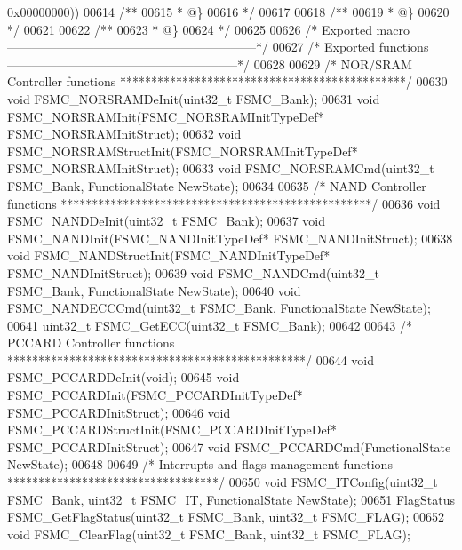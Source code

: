 \begin{DoxyCode}
      0x00000000\textcolor{preprocessor}{)}\textcolor{preprocessor}{)}
00614 \textcolor{comment}{/**}
00615 \textcolor{comment}{  * @\}}
00616 \textcolor{comment}{  */}
00617 
00618 \textcolor{comment}{/**}
00619 \textcolor{comment}{  * @\}}
00620 \textcolor{comment}{  */}
00621 
00622 \textcolor{comment}{/**}
00623 \textcolor{comment}{  * @\}}
00624 \textcolor{comment}{  */}
00625 
00626 \textcolor{comment}{/* Exported macro ------------------------------------------------------------*/}
00627 \textcolor{comment}{/* Exported functions --------------------------------------------------------*/}
00628 
00629 \textcolor{comment}{/* NOR/SRAM Controller functions **********************************************/}
00630 \textcolor{keywordtype}{void} FSMC_NORSRAMDeInit(uint32\_t FSMC\_Bank);
00631 \textcolor{keywordtype}{void} FSMC_NORSRAMInit(FSMC\_NORSRAMInitTypeDef* FSMC\_NORSRAMInitStruct);
00632 \textcolor{keywordtype}{void} FSMC_NORSRAMStructInit(FSMC\_NORSRAMInitTypeDef* FSMC\_NORSRAMInitStruct);
00633 \textcolor{keywordtype}{void} FSMC_NORSRAMCmd(uint32\_t FSMC\_Bank, FunctionalState NewState);
00634 
00635 \textcolor{comment}{/* NAND Controller functions **************************************************/}
00636 \textcolor{keywordtype}{void} FSMC_NANDDeInit(uint32\_t FSMC\_Bank);
00637 \textcolor{keywordtype}{void} FSMC_NANDInit(FSMC\_NANDInitTypeDef* FSMC\_NANDInitStruct);
00638 \textcolor{keywordtype}{void} FSMC_NANDStructInit(FSMC\_NANDInitTypeDef* FSMC\_NANDInitStruct);
00639 \textcolor{keywordtype}{void} FSMC_NANDCmd(uint32\_t FSMC\_Bank, FunctionalState NewState);
00640 \textcolor{keywordtype}{void} FSMC_NANDECCCmd(uint32\_t FSMC\_Bank, FunctionalState NewState);
00641 uint32\_t FSMC_GetECC(uint32\_t FSMC\_Bank);
00642 
00643 \textcolor{comment}{/* PCCARD Controller functions ************************************************/}
00644 \textcolor{keywordtype}{void} FSMC_PCCARDDeInit(\textcolor{keywordtype}{void});
00645 \textcolor{keywordtype}{void} FSMC_PCCARDInit(FSMC\_PCCARDInitTypeDef* FSMC\_PCCARDInitStruct);
00646 \textcolor{keywordtype}{void} FSMC_PCCARDStructInit(FSMC\_PCCARDInitTypeDef* FSMC\_PCCARDInitStruct);
00647 \textcolor{keywordtype}{void} FSMC_PCCARDCmd(FunctionalState NewState);
00648 
00649 \textcolor{comment}{/* Interrupts and flags management functions **********************************/}
00650 \textcolor{keywordtype}{void} FSMC_ITConfig(uint32\_t FSMC\_Bank, uint32\_t FSMC\_IT, FunctionalState NewState);
00651 FlagStatus FSMC_GetFlagStatus(uint32\_t FSMC\_Bank, uint32\_t FSMC\_FLAG);
00652 \textcolor{keywordtype}{void} FSMC_ClearFlag(uint32\_t FSMC\_Bank, uint32\_t FSMC\_FLAG);

\end{DoxyCode}
